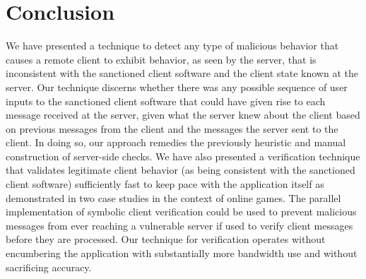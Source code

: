 \chapter{Conclusion}
\label{ch:conclusion}
We have presented a technique to detect any type of malicious behavior
that causes a remote client to exhibit behavior, as seen by the
server, that is inconsistent with the sanctioned client software and
the client state known at the server.  Our technique discerns whether
there was  any possible sequence of user inputs to the sanctioned
client software that could have given rise to each message received at
the server, given what the server knew about the client based on
previous messages from the client and the messages the server sent to
the client. In doing so, our approach remedies the previously
heuristic and manual construction of server-side checks. We have also
presented a verification technique that validates legitimate client
behavior (as being consistent with the sanctioned client software)
sufficiently fast to keep pace with the application itself as
demonstrated in two case studies in the context of online games. The
parallel implementation of symbolic client verification could be used
to prevent malicious messages from ever reaching a vulnerable server
if used to verify client messages before they are processed. Our
technique for verification operates without encumbering the
application with substantially more bandwidth use and without
sacrificing accuracy. 

%



